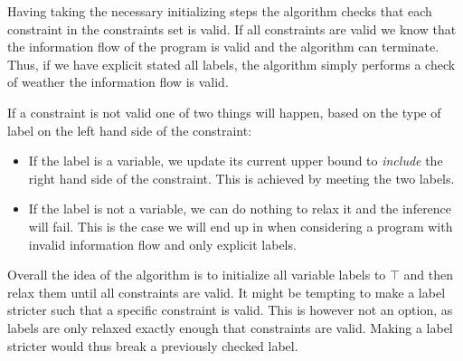 Having taking the necessary initializing steps the algorithm checks that each constraint in the constraints set is valid.
If all constraints are valid we know that the information flow of the program is valid and the algorithm can terminate.
Thus, if we have explicit stated all labels, the algorithm simply performs a check of weather the information flow is valid.

If a constraint is not valid one of two things will happen, based on the type of label on the left hand side of the constraint:
\begin{itemize}
  \item If the label is a variable, we update its current upper bound to \textit{include} the right hand side of the constraint.
  This is achieved by meeting the two labels.
  \item If the label is not a variable, we can do nothing to relax it and the inference will fail.
  This is the case we will end up in when considering a program with invalid information flow and only explicit labels.
\end{itemize}

Overall the idea of the algorithm is to initialize all variable labels to $\top$ and then relax them until all constraints are valid.
It might be tempting to make a label stricter such that a specific constraint is valid.
This is however not an option, as labels are only relaxed exactly enough that constraints are valid.
Making a label stricter would thus break a previously checked label.

